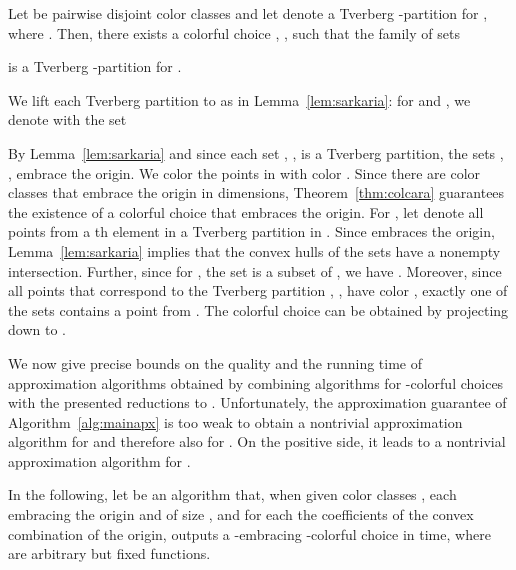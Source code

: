 \begin{theorem}\label{thm:colkirchberger}
Let  be  pairwise disjoint 
color classes and let  
denote a Tverberg
  -partition for , where . Then, there exists a colorful
  choice , , such that the family of sets

  is a Tverberg -partition for .
\end{theorem}
\begin{prf}
  We lift each Tverberg partition to  as in 
  Lemma~\ref{lem:sarkaria}: for  and , we 
  denote with  the set

By Lemma~\ref{lem:sarkaria} and since each set 
, , is a Tverberg
partition, the sets , ,
embrace the origin. We color the points in  with color . Since
there are  color classes that embrace the origin in  dimensions,
Theorem~\ref{thm:colcara} guarantees the existence of a colorful 
choice  that
embraces the origin. For , let  denote all points from a th 
element in a Tverberg partition in . Since 
 embraces
the origin, Lemma~\ref{lem:sarkaria} implies that the convex hulls of
the sets 
 have a nonempty intersection. 
Further, since for , the set
 is a subset of , we have . Moreover, since all points
that correspond to the Tverberg partition , , have
color , exactly one of the sets  contains a point 
from . The colorful choice  can be obtained by projecting 
 down to .
\end{prf}

We now give precise bounds on the quality and the running time of 
approximation algorithms obtained by
combining algorithms for -colorful choices with the presented
reductions to \CCP. Unfortunately, the approximation
guarantee of Algorithm~\ref{alg:mainapx} is too weak to obtain a nontrivial
approximation algorithm for \Tverberg and therefore also for \Centerpoint. 
On the positive side, it leads to a nontrivial approximation algorithm for
\ColKirchberger.

In the following, let  be an algorithm that, when given  
color classes
, each embracing the origin and of size
, and for each  the coefficients of the convex combination 
of the origin, outputs a -embracing -colorful choice in 
 time, where  are arbitrary but fixed functions.


